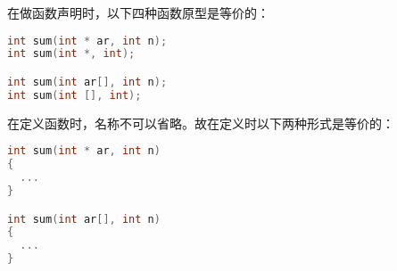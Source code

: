 \begin{frame}[fragile]\ft{\secname}
在做函数声明时，以下四种函数原型是等价的：
\begin{lstlisting}[language=c,backgroundcolor=\color{red!20}]
int sum(int * ar, int n);
int sum(int *, int);

int sum(int ar[], int n);
int sum(int [], int);
\end{lstlisting}
\end{frame}

\begin{frame}[fragile]\ft{\secname}
在定义函数时，名称不可以省略。故在定义时以下两种形式是等价的：
\begin{lstlisting}[language=c,backgroundcolor=\color{red!20}]
int sum(int * ar, int n)
{
  ...
}

int sum(int ar[], int n)
{
  ...
}
\end{lstlisting}
\end{frame}

